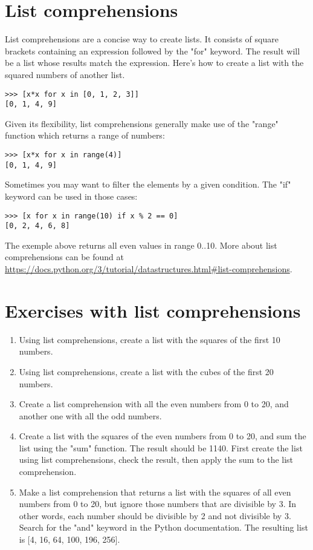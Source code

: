 \section{List comprehensions}

List comprehensions are a concise way to create lists. It consists of square brackets containing an expression followed by the "for" keyword. The result will be a list whose results match the expression. Here's how to create a list with the squared numbers of another list.

\begin{lstlisting}
>>> [x*x for x in [0, 1, 2, 3]]
[0, 1, 4, 9]
\end{lstlisting}

Given its flexibility, list comprehensions generally make use of the "range" function which returns a range of numbers:

\begin{lstlisting}
>>> [x*x for x in range(4)]
[0, 1, 4, 9]
\end{lstlisting}

Sometimes you may want to filter the elements by a given condition. The "if" keyword can be used in those cases:

\begin{lstlisting}
>>> [x for x in range(10) if x % 2 == 0]
[0, 2, 4, 6, 8]
\end{lstlisting}

The exemple above returns all even values in range 0..10. More about list comprehensions can be found at \url{https://docs.python.org/3/tutorial/datastructures.html#list-comprehensions}.

\section{Exercises with list comprehensions}

\begin{enumerate}

\item Using list comprehensions, create a list with the squares of the first 10 numbers.

\item Using list comprehensions, create a list with the cubes of the first 20 numbers.

\item Create a list comprehension with all the even numbers from 0 to 20, and another one with all the odd numbers.

\item Create a list with the squares of the even numbers from 0 to 20, and sum the list using the "sum" function. The result should be 1140. First create the list using list comprehensions, check the result, then apply the sum to the list comprehension.

\item Make a list comprehension that returns a list with the squares of all even numbers from 0 to 20, but ignore those numbers that are divisible by 3. In other words, each number should be divisible by 2 and not divisible by 3. Search for the "and" keyword in the Python documentation. The resulting list is [4, 16, 64, 100, 196, 256].

\end{enumerate}
